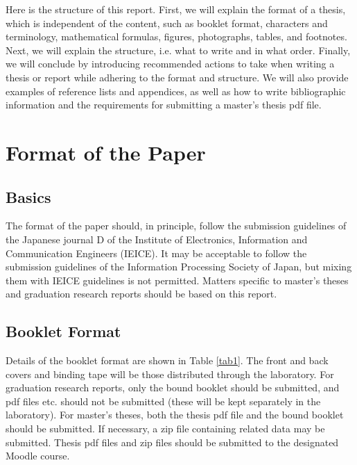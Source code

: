 Here is the structure of this report. First, we will explain the format of a thesis, which is independent of the content, such as booklet format, characters and terminology, mathematical formulas, figures, photographs, tables, and footnotes. Next, we will explain the structure, i.e. what to write and in what order. Finally, we will conclude by introducing recommended actions to take when writing a thesis or report while adhering to the format and structure. We will also provide examples of reference lists and appendices, as well as how to write bibliographic information and the requirements for submitting a master's thesis pdf file.

\chapter{Format of the Paper}
\section{Basics}
The format of the paper should, in principle, follow the submission guidelines of the Japanese journal D of the Institute of Electronics, Information and Communication Engineers (IEICE). It may be acceptable to follow the submission guidelines of the Information Processing Society of Japan, but mixing them with IEICE guidelines is not permitted. Matters specific to master's theses and graduation research reports should be based on this report.

\section{Booklet Format}
Details of the booklet format are shown in Table \ref{tab1}. The front and back covers and binding tape will be those distributed through the laboratory. For graduation research reports, only the bound booklet should be submitted, and pdf files etc. should not be submitted (these will be kept separately in the laboratory). For master's theses, both the thesis pdf file and the bound booklet should be submitted. If necessary, a zip file containing related data may be submitted. Thesis pdf files and zip files should be submitted to the designated Moodle course.


